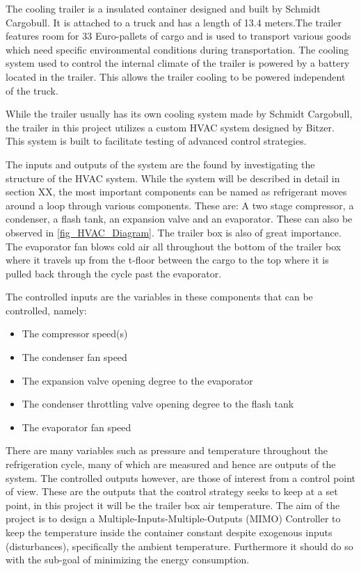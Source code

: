 The cooling trailer is a insulated container designed and built by Schmidt Cargobull. It is attached to a truck and has a length of 13.4 meters.The trailer features room for 33 Euro-pallets of cargo and is used to transport various goods which need specific environmental conditions during transportation. The cooling system used to control the internal climate of the trailer is powered by a battery located in the trailer. This allows the trailer cooling to be powered independent of the truck.

While the trailer usually has its own cooling system made by Schmidt Cargobull, the trailer in this project utilizes a custom HVAC system designed by Bitzer. This system is built to facilitate testing of advanced control strategies.

The inputs and outputs of the system are the found by investigating the structure of the HVAC system. While the system will be described in detail in section XX, the most important components can be named as refrigerant moves around a loop through various components. These are: A two stage compressor, a condenser, a flash tank, an expansion valve and an evaporator. These can also be observed in \cref{fig_HVAC_Diagram}. The trailer box is also of great importance. The evaporator fan blows cold air all throughout the bottom of the trailer box where it travels up from the t-floor between the cargo to the top where it is pulled back through the cycle past the evaporator.

The controlled inputs are the variables in these components that can be controlled, namely:

\begin{itemize}
	\item The compressor speed(s)
	\item The condenser fan speed
	\item The expansion valve opening degree to the evaporator
	\item The condenser throttling valve opening degree to the flash tank
	\item The evaporator fan speed
\end{itemize}

There are many variables such as pressure and temperature throughout the refrigeration cycle, many of which are measured and hence are outputs of the system. 
The controlled outputs however, are those of interest from a control point of view. These are the outputs that the control strategy seeks to keep at a set point, in this project it will be the trailer box air temperature. The aim of the project is to design a Multiple-Inputs-Multiple-Outputs (MIMO) Controller to keep the temperature inside the container constant despite exogenous inputs (disturbances), specifically the ambient temperature. Furthermore it should do so with the sub-goal of minimizing the energy consumption.


